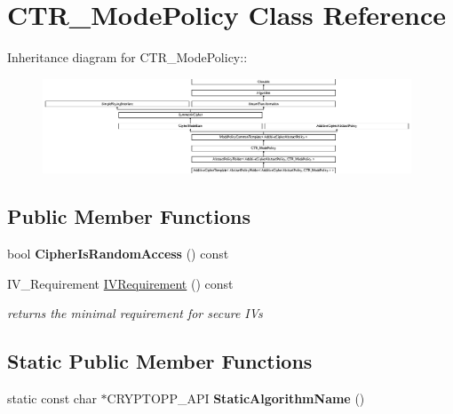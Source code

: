 \hypertarget{class_c_t_r___mode_policy}{
\section{CTR\_\-ModePolicy Class Reference}
\label{class_c_t_r___mode_policy}
}
Inheritance diagram for CTR\_\-ModePolicy::\begin{figure}[H]
\begin{center}
\leavevmode
\includegraphics[height=2.82353cm]{class_c_t_r___mode_policy}
\end{center}
\end{figure}
\subsection*{Public Member Functions}
\begin{DoxyCompactItemize}
\item 
\hypertarget{class_c_t_r___mode_policy_a2f5a71770ff1028549c85d0ceead4119}{
bool {\bfseries CipherIsRandomAccess} () const }
\label{class_c_t_r___mode_policy_a2f5a71770ff1028549c85d0ceead4119}

\item 
\hypertarget{class_c_t_r___mode_policy_aa1362c4227cb260577d227750c2f7ff8}{
IV\_\-Requirement \hyperlink{class_c_t_r___mode_policy_aa1362c4227cb260577d227750c2f7ff8}{IVRequirement} () const }
\label{class_c_t_r___mode_policy_aa1362c4227cb260577d227750c2f7ff8}

\begin{DoxyCompactList}\small\item\em returns the minimal requirement for secure IVs \item\end{DoxyCompactList}\end{DoxyCompactItemize}
\subsection*{Static Public Member Functions}
\begin{DoxyCompactItemize}
\item 
\hypertarget{class_c_t_r___mode_policy_a66722d8b0ca0b9f990035ac02d93ef57}{
static const char $\ast$CRYPTOPP\_\-API {\bfseries StaticAlgorithmName} ()}
\label{class_c_t_r___mode_policy_a66722d8b0ca0b9f990035ac02d93ef57}

\end{DoxyCompactItemize}
